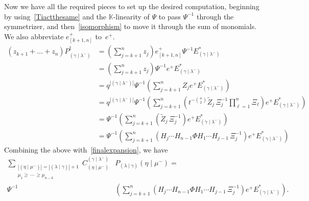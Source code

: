 \documentclass[ALCO]{cedram}
\newcommand{\Lq}{\mathbb{K}}
\newcommand{\ZZ}{\widetilde{Z}}
\newcommand{\ep}{e^+}
\newcommand{\eplusB}{e^+_{[k+1,n]}}
\newcommand{\Estar}[1]{E^*_{#1}}
\newcommand{\PB}[1]{P_{#1}^\dagger}
\newcommand{\PP}{P_{(\lambda \mid \gamma)}}
\newcommand{\nudom}{{( \lambda \mid \gamma )}}
\newcommand{\lambdagamma}{{\nudom}}
\newcommand{\gammalambdamin}{{(\gamma \mid \lambda^-)}}
\newcommand{\etamu}{{(\eta \mid \mu^-)}}
\begin{document}
Now we have all the required pieces to set up the desired computation, beginning by using~\eqref{Tiactthesame} and the $\Lq$-linearity of $\Psi$ to pass $\Psi^{-1}$ through the symmetrizer, and then~\eqref{isomorphism} to move it through the sum of monomials. We also abbreviate $\eplusB$ to~$\ep$.
\begin{align*}
    (z_{k+1} + \dots + z_n) \PB{\gammalambdamin} &=  \left(\sum_{j=k+1}^n z_j \right) \eplusB \Psi^{-1} \Estar{\gammalambdamin}\\
     &=  \left(\sum_{j=k+1}^n z_j \right) \Psi^{-1} \ep \Estar{\gammalambdamin}\\
    &= q^{|\gammalambdamin|} \Psi^{-1} \left( \sum_{j=k+1}^n Z_j \ep \Estar{\gammalambdamin}\right)\\
    &= q^{|\gammalambdamin|}\Psi^{-1}  \left( \sum_{j=k+1}^n \left( t^{-\binom{n}{2}} \ZZ_j\, \Xi_j^{-1} \prod_{\ell=1}^n \Xi_\ell \right) \ep \Estar{\gammalambdamin}\right)\\
    &= \Psi^{-1} \left( \sum_{j=k+1}^n \left( \ZZ_j\, \Xi_j^{-1} \right) \ep \Estar{\gammalambdamin}\right)\\
    &= \Psi^{-1} \left( \sum_{j=k+1}^n \left( H_j \dotsm H_{n-1} \Phi H_1 \dotsm H_{j-1} \, \Xi_j^{-1} \right) \ep \Estar{\gammalambdamin}\right)   \end{align*}
Combining the above with~\eqref{finalexpansion}, we have
\begin{align*} \sum_{\substack{|\etamu| = |\lambdagamma| + 1 \\ \mu_1 \geq \, \dotsm \, \geq \mu_{n-k}}}  C^{\gammalambdamin}_{\etamu} &\PP{\etamu} = \\ \Psi^{-1} &\left( \sum_{j=k+1}^n \left( H_j \dotsm H_{n-1} \Phi H_1 \dotsm H_{j-1} \, \Xi_j^{-1} \right) \ep \Estar{\gammalambdamin}\right). \end{align*}
\end{document}
